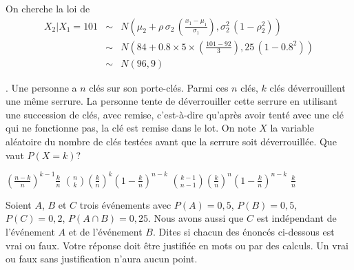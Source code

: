 \begin{questions}
\begin{solution}
On cherche la loi de
		\begin{eqnarray*}
			{X}_2|{X}_1=101 &\sim& N\left(\mu_2 +\rho\, \sigma_2\, \left(\frac{x_1-\mu_1}{\sigma_1}\right),\sigma_2^2 \,\left(1-\rho_2^2\right)\right)\\
			&\sim& N\left(84 +0.8\times 5\times \left(\frac{101-92}{3}\right),25 \,\left(1-0.8^2\right)\right)\\
			&\sim& N\left(96, 9 \right)
	\end{eqnarray*}
\end{solution}

\vspace{1cm}
\newpage
.
\newpage
\question[3] Une personne a $n$ clés sur son porte-clés.
Parmi ces $n$ clés, $k$ clés déverrouillent une même serrure. 
La personne tente de déverrouiller cette serrure en utilisant une succession de clés, avec remise, c'est-à-dire qu'après avoir tenté avec une clé qui ne fonctionne pas, la clé est remise dans le lot.
On note $X$ la variable aléatoire du nombre de clés testées avant que la serrure soit déverrouillée.
Que vaut $P(X=k)$?

\begin{oneparcheckboxes}
    \choice $\displaystyle \left(\frac{n-k}{n}\right)^{k-1}\frac{k}{n}$
    \choice $\displaystyle \binom{n}{k}\left(\frac{k}{n}\right)^{k}\left(1-\frac{k}{n}\right)^{n-k}$
    \correctchoice $\displaystyle \binom{k-1}{n-1}\left(\frac{k}{n}\right)^{n}\left(1-\frac{k}{n}\right)^{n-k}$
    \choice $\displaystyle \frac{k}{n}$
\end{oneparcheckboxes}

\vspace{0.5cm}

\question\label{pa} Soient $A$, $B$ et $C$ trois événements avec $P(A)=0,5$, $P(B)=0,5$, $P(C)=0,2$, $P(A\cap B)=0,25$. Nous avons aussi que $C$ est indépendant de l'événement $A$ et de l'événement $B$. Dites si chacun des énoncés ci-dessous est vrai ou faux. Votre réponse doit être justifiée en mots ou par des calculs. Un vrai ou faux sans justification n'aura aucun point.

\vspace{0.5cm}
\end{questions}
